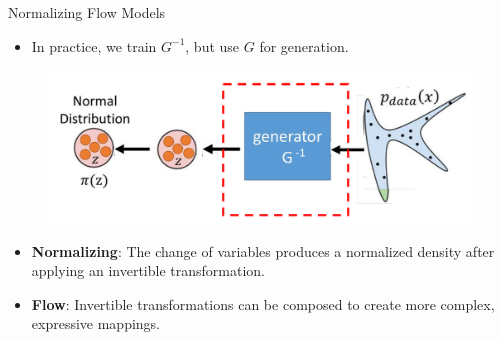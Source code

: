 \begin{frame}[allowframebreaks]{Normalizing Flow Models}
\framebreak

\begin{itemize}
    \item In practice, we train $G^{-1}$, but use $G$ for generation.
\end{itemize}

\begin{figure}
    \centering
    \includegraphics[height=0.5\textheight, width=\textwidth, keepaspectratio]{images/norm-flow/nfm_1.png}
\end{figure}

\framebreak

\begin{itemize}
    \item \textbf{Normalizing}: The change of variables produces a normalized density after applying an invertible transformation.
    \item \textbf{Flow}: Invertible transformations can be composed to create more complex, expressive mappings.
\end{itemize}
\end{frame}